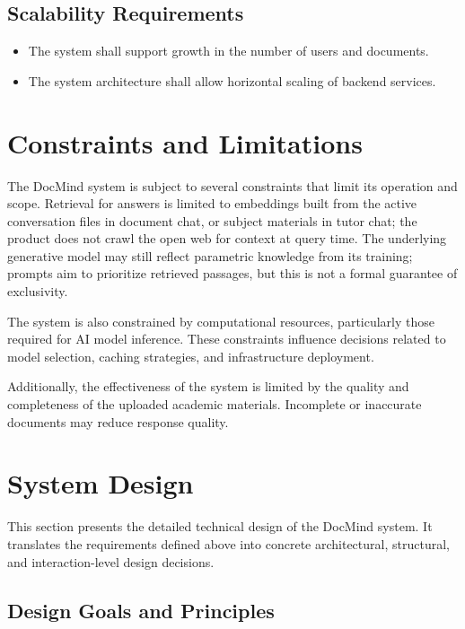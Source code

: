 \documentclass[12pt, a4paper, oneside]{report}
\let\oldsection\section
\renewcommand{\section}{%
  \addtocontents{toc}{\protect\needspace{4\baselineskip}}%
  \oldsection
}
\let\oldsubsection\subsection
\renewcommand{\subsection}{%
  \addtocontents{toc}{\protect\needspace{3\baselineskip}}%
  \oldsubsection
}
\begin{document}
\subsection{Scalability Requirements}

\begin{itemize}
  \item The system shall support growth in the number of users and documents.
  \item The system architecture shall allow horizontal scaling of backend services.
\end{itemize}

\section{Constraints and Limitations}

The DocMind system is subject to several constraints that limit its operation and scope. Retrieval for answers is limited to embeddings built from the active conversation files in document chat, or subject materials in tutor chat; the product does not crawl the open web for context at query time. The underlying generative model may still reflect parametric knowledge from its training; prompts aim to prioritize retrieved passages, but this is not a formal guarantee of exclusivity.

The system is also constrained by computational resources, particularly those required for AI model inference. These constraints influence decisions related to model selection, caching strategies, and infrastructure deployment.

Additionally, the effectiveness of the system is limited by the quality and completeness of the uploaded academic materials. Incomplete or inaccurate documents may reduce response quality.

\newpage
\section{System Design}

This section presents the detailed technical design of the DocMind system. It translates the requirements defined above into concrete architectural, structural, and interaction-level design decisions.

\subsection{Design Goals and Principles}
\end{document}
